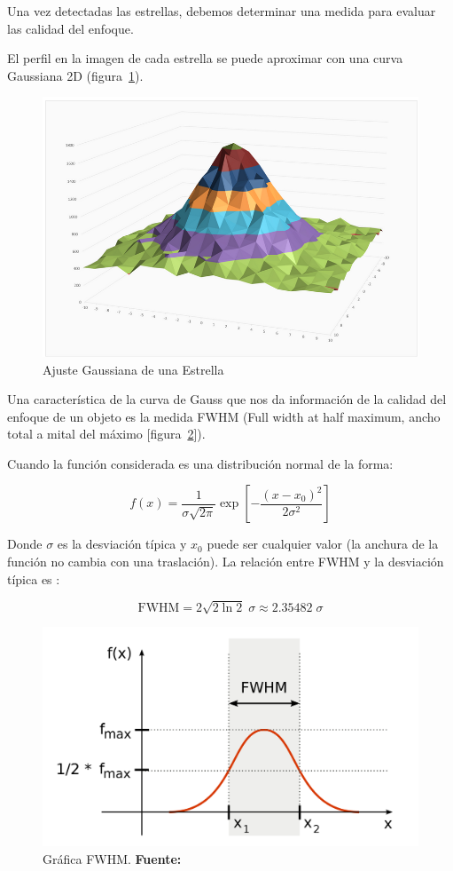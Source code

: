 Una vez detectadas las estrellas, debemos determinar una medida para evaluar las calidad del enfoque.

El perfil en la imagen de cada estrella se puede aproximar con una curva Gaussiana 2D (figura~\ref{fig:estrellaGauss}).


\begin{figure}
	\centering
	\includegraphics[width=0.9\linewidth]{../images/estrella_gauss}
	\caption{Ajuste Gaussiana de una Estrella}
	\label{fig:estrellaGauss}
\end{figure}


Una característica de la curva de Gauss que nos da información de la calidad del enfoque de un objeto es la medida FWHM (Full width at half maximum, ancho total a mital del máximo [figura~\ref{fig:FWHM}]).


Cuando la función considerada es una distribución normal de la forma: 


	$$ f(x) = \frac{1}{\sigma \sqrt{2 \pi} } \exp \left[ -\frac{(x-x_0)^2}{2 \sigma^2} \right] $$

Donde  $ \sigma $ es la desviación típica y  $x_0$ puede ser cualquier valor (la anchura de la función no cambia con una traslación). La relación entre FWHM y la desviación típica es \cite{wolfram}: 

$$  \mathrm{FWHM} =   2 \sqrt{2 \ln 2 } \; \sigma \approx 2.35482 \; \sigma $$

	\begin{figure}[h]
		\centering
		\includegraphics[width=0.7\linewidth]{../images/FWHM}
		\caption[Grafica FWHM]{Gráfica FWHM. \textbf{Fuente:} \cite{fwhm}}
		\label{fig:FWHM}
	\end{figure}


